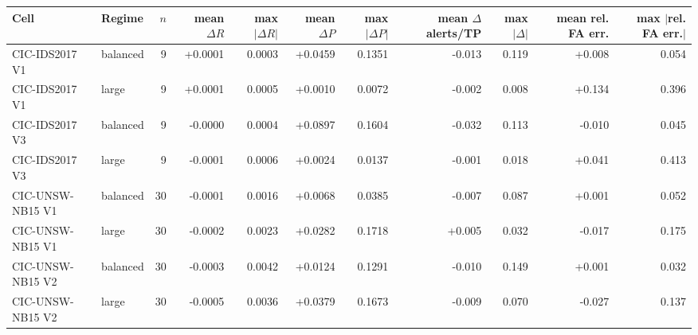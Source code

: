 \begin{tabular}{@{}llrrrrrrrrr@{}}
\toprule
Cell & Regime & $n$ & mean $\Delta R$ & max $|\Delta R|$ & mean $\Delta P$ & max $|\Delta P|$ & mean $\Delta$ alerts/TP & max $|\Delta|$ & mean rel. FA err. & max $|$rel. FA err.$|$ \\
\midrule
CIC-IDS2017 V1 & balanced & 9 & +0.0001 & 0.0003 & +0.0459 & 0.1351 & -0.013 & 0.119 & +0.008 & 0.054 \\
CIC-IDS2017 V1 & large & 9 & +0.0001 & 0.0005 & +0.0010 & 0.0072 & -0.002 & 0.008 & +0.134 & 0.396 \\
CIC-IDS2017 V3 & balanced & 9 & -0.0000 & 0.0004 & +0.0897 & 0.1604 & -0.032 & 0.113 & -0.010 & 0.045 \\
CIC-IDS2017 V3 & large & 9 & -0.0001 & 0.0006 & +0.0024 & 0.0137 & -0.001 & 0.018 & +0.041 & 0.413 \\
CIC-UNSW-NB15 V1 & balanced & 30 & -0.0001 & 0.0016 & +0.0068 & 0.0385 & -0.007 & 0.087 & +0.001 & 0.052 \\
CIC-UNSW-NB15 V1 & large & 30 & -0.0002 & 0.0023 & +0.0282 & 0.1718 & +0.005 & 0.032 & -0.017 & 0.175 \\
CIC-UNSW-NB15 V2 & balanced & 30 & -0.0003 & 0.0042 & +0.0124 & 0.1291 & -0.010 & 0.149 & +0.001 & 0.032 \\
CIC-UNSW-NB15 V2 & large & 30 & -0.0005 & 0.0036 & +0.0379 & 0.1673 & -0.009 & 0.070 & -0.027 & 0.137 \\
\bottomrule
\end{tabular}
